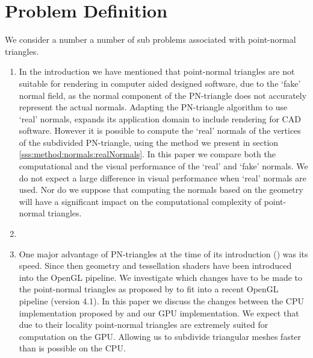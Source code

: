 \section{Problem Definition}
\label{s:problem}
We consider a number a number of sub problems associated with point-normal triangles.

\begin{enumerate}[label=(\roman*)]
	\item \label{it:problem:fakeNormals}
		In the introduction we have mentioned that point-normal triangles are not suitable for rendering in computer aided designed software, due to the `fake' normal field, as the normal component of the PN-triangle does not accurately represent the actual normals. Adapting the PN-triangle algorithm to use `real' normals, expands its application domain to include rendering for CAD software.
		However it is possible to compute the `real' normals of the vertices of the subdivided PN-triangle, using the method we present in section \ref{sss:method:normals:realNormals}. 
		In this paper we compare both the computational and the visual performance of the `real' and `fake' normals. 
		We do not expect a large difference in visual performance when `real' normals are used. Nor do we suppose that computing the normals based on the geometry will have a significant impact on the computational complexity of point-normal triangles.


	\item \label{it:problem:CompareWithPhongTesselation}

	\item \label{it:problem:GPUImplementation}
		One major advantage of PN-triangles at the time of its introduction (\citeyear{vlachos2001curved}) was its speed. Since then geometry and tessellation shaders have been introduced into the OpenGL pipeline. 
		We investigate which changes have to be made to the point-normal triangles as proposed by \citeauthor{vlachos2001curved} to fit into a recent OpenGL pipeline (version 4.1).
		In this paper we discuss the changes between the CPU implementation proposed by \citeauthor{vlachos2001curved} and our GPU implementation. 
		We expect that due to their locality point-normal triangles are extremely suited for computation on the GPU. Allowing us to subdivide triangular meshes faster than is possible on the CPU. 
\end{enumerate}